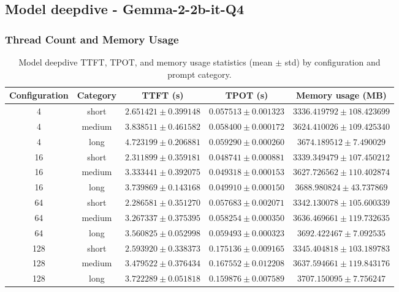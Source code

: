 \documentclass[11pt,a4paper]{article}
\begin{document}
    \subsection{Model deepdive - Gemma-2-2b-it-Q4}
    \subsubsection{Thread Count and Memory Usage}
    \begin{table}[H]
    \centering
    \small
    \setlength{\tabcolsep}{4pt}
    \begin{tabularx}{\textwidth}{c|c|c|c|c}
        \toprule
        Configuration & Category & TTFT (s) & TPOT (s) & Memory usage (MB) \\
        \midrule
        4   & short  & $2.651421 \pm 0.399148$ & $0.057513 \pm 0.001323$ & $3336.419792 \pm 108.423699$ \\
        4   & medium & $3.838511 \pm 0.461582$ & $0.058400 \pm 0.000172$ & $3624.410026 \pm 109.425340$ \\
        4   & long   & $4.723199 \pm 0.206881$ & $0.059290 \pm 0.000260$ & $3674.189512 \pm 7.490029$ \\
        16  & short  & $2.311899 \pm 0.359181$ & $0.048741 \pm 0.000881$ & $3339.349479 \pm 107.450212$ \\
        16  & medium & $3.333441 \pm 0.392075$ & $0.049318 \pm 0.000153$ & $3627.726562 \pm 110.402874$ \\
        16  & long   & $3.739869 \pm 0.143168$ & $0.049910 \pm 0.000150$ & $3688.980824 \pm 43.737869$ \\
        64  & short  & $2.286581 \pm 0.351270$ & $0.057683 \pm 0.002071$ & $3342.130078 \pm 105.600339$ \\
        64  & medium & $3.267337 \pm 0.375395$ & $0.058254 \pm 0.000350$ & $3636.469661 \pm 119.732635$ \\
        64  & long   & $3.560825 \pm 0.052998$ & $0.059493 \pm 0.000323$ & $3692.422467 \pm 7.092535$ \\
        128 & short  & $2.593920 \pm 0.338373$ & $0.175136 \pm 0.009165$ & $3345.404818 \pm 103.189783$ \\
        128 & medium & $3.479522 \pm 0.376434$ & $0.167552 \pm 0.012208$ & $3637.594661 \pm 119.843176$ \\
        128 & long   & $3.722289 \pm 0.051818$ & $0.159876 \pm 0.007589$ & $3707.150095 \pm 7.756247$ \\
        \bottomrule
    \end{tabularx}
    \caption{Model deepdive TTFT, TPOT, and memory usage statistics (mean $\pm$ std) by configuration and prompt category.}
    \label{tab:model_deepdive_summary}
    \end{table}
\end{document}
